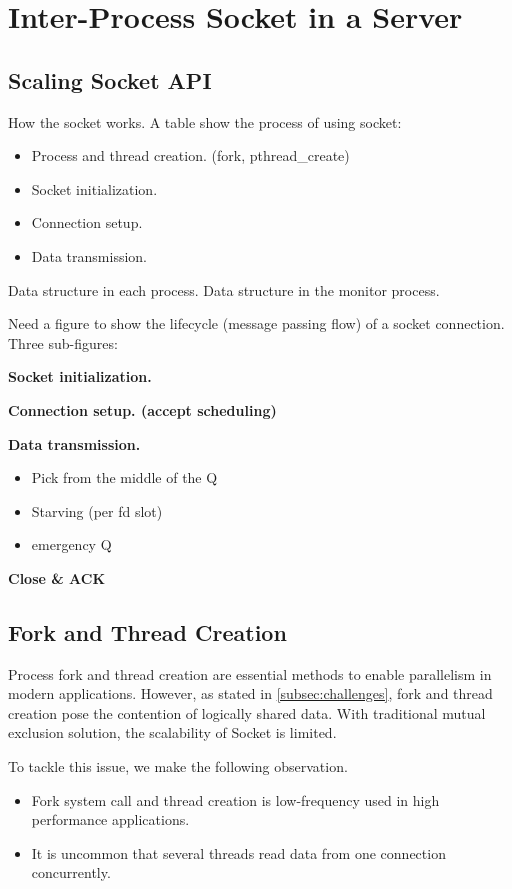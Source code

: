 \section{Inter-Process Socket in a Server}
\label{sec:intra-server}

\subsection{Scaling Socket API}
\label{subsec:socket-api}

How the socket works. A table show the process of using socket:

\begin{itemize}
	\item Process and thread creation. (fork, pthread\_create)
	\item Socket initialization.
	\item Connection setup.
	\item Data transmission.
\end{itemize}


Data structure in each process. Data structure in the monitor process.

Need a figure to show the lifecycle (message passing flow) of a socket connection. Three sub-figures:


	 \textbf{Socket initialization.}
	  
	 \textbf{Connection setup. (accept scheduling)}
	 
	 \textbf{Data transmission.}
\begin{itemize}
	\item Pick from the middle of the Q
	\item Starving (per fd slot)
	\item emergency Q
\end{itemize}

    \textbf{Close \& ACK}


\subsection{Fork and Thread Creation}
\label{subsec:fork}

Process fork and thread creation are essential methods to enable parallelism in modern applications. 
However, as stated in \ref{subsec:challenges}, fork and thread creation pose the contention of logically shared data. With traditional mutual exclusion solution, the scalability of Socket is limited.

To tackle this issue, we make the following observation.
\begin{itemize}
	\item Fork system call and thread creation is low-frequency used in high performance applications.
	\item It is uncommon that several threads read data from one connection concurrently.
\end{itemize} 


